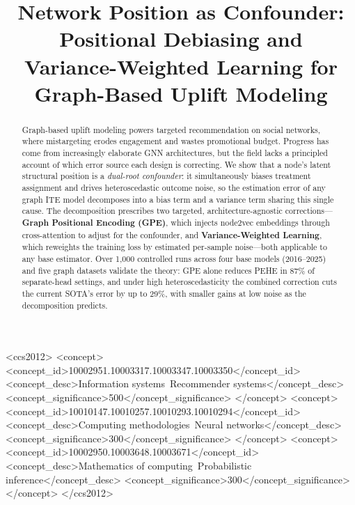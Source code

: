 \documentclass[sigconf,anonymous,review]{acmart}
\begin{document}
\title{Network Position as Confounder: Positional Debiasing and\\Variance-Weighted Learning for Graph-Based Uplift Modeling}

\begin{CCSXML}
<ccs2012>
<concept>
<concept_id>10002951.10003317.10003347.10003350</concept_id>
<concept_desc>Information systems~Recommender systems</concept_desc>
<concept_significance>500</concept_significance>
</concept>
<concept>
<concept_id>10010147.10010257.10010293.10010294</concept_id>
<concept_desc>Computing methodologies~Neural networks</concept_desc>
<concept_significance>300</concept_significance>
</concept>
<concept>
<concept_id>10002950.10003648.10003671</concept_id>
<concept_desc>Mathematics of computing~Probabilistic inference</concept_desc>
<concept_significance>300</concept_significance>
</concept>
</ccs2012>
\end{CCSXML}

\begin{abstract}
Graph-based uplift modeling powers targeted recommendation on social networks, where mistargeting erodes engagement and wastes promotional budget. Progress has come from increasingly elaborate GNN architectures, but the field lacks a principled account of which error source each design is correcting. We show that a node's latent structural position is a \emph{dual-root confounder}: it simultaneously biases treatment assignment and drives heteroscedastic outcome noise, so the estimation error of any graph ITE model decomposes into a bias term and a variance term sharing this single cause. The decomposition prescribes two targeted, architecture-agnostic corrections---\textbf{Graph Positional Encoding (GPE)}, which injects node2vec embeddings through cross-attention to adjust for the confounder, and \textbf{Variance-Weighted Learning}, which reweights the training loss by estimated per-sample noise---both applicable to any base estimator. Over 1{,}000 controlled runs across four base models (2016--2025) and five graph datasets validate the theory: GPE alone reduces PEHE in 87\% of separate-head settings, and under high heteroscedasticity the combined correction cuts the current SOTA's error by up to 29\%, with smaller gains at low noise as the decomposition predicts.
\end{abstract}
\end{document}
